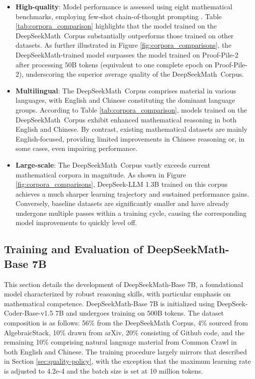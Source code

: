 \begin{itemize}[topsep=0pt]
    \item \textbf{High-quality}:
    Model performance is assessed using eight mathematical benchmarks, employing few-shot chain-of-thought prompting \cite{cot}. Table \ref{tab:corpora_comparison} highlights that the model trained on the DeepSeekMath~Corpus substantially outperforms those trained on other datasets. As further illustrated in Figure \ref{fig:corpora_comparisons}, the DeepSeekMath-trained model surpasses the model trained on Proof-Pile-2 after processing 50B tokens (equivalent to one complete epoch on Proof-Pile-2), underscoring the superior average quality of the DeepSeekMath~Corpus.
    \item \textbf{Multilingual}:
    The DeepSeekMath~Corpus comprises material in various languages, with English and Chinese constituting the dominant language groups. According to Table \ref{tab:corpora_comparison}, models trained on the DeepSeekMath~Corpus exhibit enhanced mathematical reasoning in both English and Chinese. By contrast, existing mathematical datasets are mainly English-focused, providing limited improvements in Chinese reasoning or, in some cases, even impairing performance.
    \item \textbf{Large-scale}:
    The DeepSeekMath~Corpus vastly exceeds current mathematical corpora in magnitude. As shown in Figure \ref{fig:corpora_comparisons}, DeepSeek-LLM 1.3B trained on this corpus achieves a much sharper learning trajectory and sustained performance gains. Conversely, baseline datasets are significantly smaller and have already undergone multiple passes within a training cycle, causing the corresponding model improvements to quickly level off.
\end{itemize}

\subsection{Training and Evaluation of DeepSeekMath-Base 7B}

This section details the development of DeepSeekMath-Base 7B, a foundational model characterized by robust reasoning skills, with particular emphasis on mathematical competence. DeepSeekMath-Base 7B is initialized using DeepSeek-Coder-Base-v1.5 7B \citep{deepseek-coder} and undergoes training on 500B tokens. The dataset composition is as follows: 56\% from the DeepSeekMath Corpus, 4\% sourced from AlgebraicStack, 10\% drawn from arXiv, 20\% consisting of Github code, and the remaining 10\% comprising natural language material from Common Crawl in both English and Chinese. The training procedure largely mirrors that described in Section \ref{sec:quality-policy}, with the exception that the maximum learning rate is adjusted to 4.2e-4 and the batch size is set at 10 million tokens.


